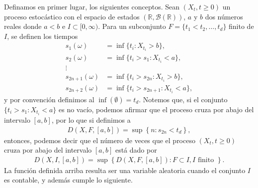 Definamos en primer lugar, los siguientes conceptos. Sean $(X_t, t \geq 0)$ un proceso estocástico con el espacio de estados $(\mathbb{R}, \mathcal{B}(\mathbb{R}))$, $a$ y $b$ dos números reales donde $a < b$ e $I \subset [0, \infty)$. Para un subconjunto $F = \{t_1 < t_2, \ldots, t_d\}$ finito de $I$, se definen los tiempos
\begin{align*}
	s_1(\omega) & = \inf \{t_i : X_{t_i} > b\}, \\
    s_2(\omega) & = \inf \{t_i > s_1 : X_{t_i} < a\}, \\
    \vdots \\
    s_{2n + 1}(\omega) & = \inf \{ t_i > s_{2n} : X_{t_i} > b \}, \\
    s_{2n + 2}(\omega) & = \inf \{ t_i > s_{2n + 1} : X_{t_i} < a \},
\end{align*}
y por convención definimos al $\inf(\emptyset) = t_d$. Notemos que, si el conjunto $\{t_i > s_1 : X_{t_i} < a\}$ es no vacío, podemos afirmar que el proceso cruza por abajo del intervalo $[a, b]$, por lo que si definimos a
\begin{align*}
	D(X, F, [a, b]) = \sup \left\{ n : s_{2n} < t_d \right\},
\end{align*}
entonces, podemos decir que el número de veces que el proceso $(X_t, t \geq 0)$ cruza por abajo del intervalo $[a, b]$ está dado por
\begin{align}
	D(X, I, [a, b]) = \sup \left\{ D(X, F, [a, b]) : F \subset I, I \text{ finito } \right\}.
\end{align}
La función definida arriba resulta ser una variable aleatoria cuando el conjunto $I$ es contable, y además cumple lo siguiente.

